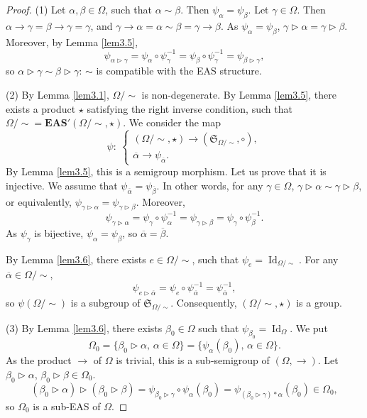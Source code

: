 \documentclass[pdftex]{sigma}
\numberwithin{equation}{section}
\newcommand{\eas}{\mathbf{EAS}}
\begin{document}
\begin{proof}
(1) Let $\alpha,\beta \in \Omega$, such that $\alpha \sim\beta$. Then $\psi_\alpha=\psi_\beta$. Let $\gamma \in \Omega$. Then $\alpha \rightarrow \gamma=\beta \rightarrow \gamma=\gamma$, and $\gamma \rightarrow \alpha=\alpha \sim \beta=\gamma \rightarrow \beta$.
As $\psi_\alpha=\psi_\beta$, $\gamma \triangleright \alpha=\gamma \triangleright \beta$. Moreover, by Lemma \ref{lem3.5},
\[\psi_{\alpha \triangleright \gamma}=\psi_\alpha \circ \psi_\gamma^{-1}=\psi_\beta\circ \psi_\gamma^{-1}=\psi_{\beta \triangleright \gamma},\]
so $\alpha \triangleright \gamma\sim \beta \triangleright \gamma$: $\sim$ is compatible with the EAS structure.

(2) By Lemma \ref{lem3.1}, $\Omega/{\sim}$ is non-degenerate. By Lemma \ref{lem3.5}, there exists a product $\star$ satisfying the right inverse condition, such that $\Omega/{\sim}=\eas'(\Omega/{\sim},\star)$. We consider the map
\[\psi\colon\ \begin{cases}
(\Omega/{\sim},\star) \longrightarrow (\mathfrak{S}_{\Omega/{\sim}},\circ),\\
\overline{\alpha} \longrightarrow \psi_{\overline{\alpha}}.
\end{cases}\]
By Lemma \ref{lem3.5}, this is a semigroup morphism. Let us prove that it is injective. We assume that $\psi_{\overline{\alpha}}=\psi_{\overline{\beta}}$.
In other words, for any $\gamma \in \Omega$, $\gamma \triangleright \alpha\sim \gamma \triangleright \beta$, or equivalently, $\psi_{\gamma \triangleright \alpha}=\psi_{\gamma \triangleright \beta}$. Moreover,
\[\psi_{\gamma \triangleright \alpha}=\psi_\gamma \circ \psi_\alpha^{-1}=\psi_{\gamma \triangleright \beta}=\psi_\gamma \circ \psi_\beta^{-1}.\]
As $\psi_\gamma$ is bijective, $\psi_\alpha=\psi_\beta$, so $\overline{\alpha}=\overline{\beta}$.

By Lemma \ref{lem3.6}, there exists $e\in \Omega/{\sim}$, such that $\psi_e=\operatorname{Id}_{\Omega/{\sim}}$. For any $\overline{\alpha}\in \Omega/{\sim}$,
\[\psi_{e\triangleright \overline{\alpha}}=\psi_e\circ \psi_{\overline{\alpha}}^{-1}=\psi_{\overline{\alpha}}^{-1},\]
so $\psi(\Omega/{\sim})$ is a subgroup of $\mathfrak{S}_{\Omega/{\sim}}$. Consequently, $(\Omega/{\sim},\star)$ is a group.

(3) By Lemma \ref{lem3.6}, there exists $\beta_0\in \Omega$ such that $\psi_{\beta_0}=\operatorname{Id}_\Omega$. We put
\[\Omega_0=\{\beta_0\triangleright \alpha,\, \alpha \in \Omega\}=\{\psi_\alpha(\beta_0),\, \alpha \in \Omega\}.\]
As the product $\rightarrow$ of $\Omega$ is trivial, this is a sub-semigroup of $(\Omega,\rightarrow)$. Let $\beta_0\triangleright \alpha$, $\beta_0\triangleright \beta \in \Omega_0$.
\[(\beta_0\triangleright \alpha)\triangleright (\beta_0\triangleright \beta)=\psi_{\beta_0\triangleright \gamma}\circ \psi_{\alpha}(\beta_0)=\psi_{(\beta_0\triangleright \gamma)*\alpha}(\beta_0)\in \Omega_0,\]
so $\Omega_0$ is a sub-EAS of $\Omega$.


\end{proof}
\end{document}
